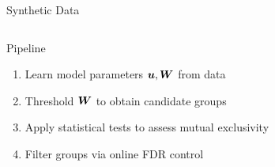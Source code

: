\documentclass[mathserif]{beamer}
\begin{document}
\begin{frame}{Synthetic Data}
\begin{columns}
\begin{column}{0.7\textwidth}
%
\end{column}
\end{columns}
\end{frame}

\begin{frame}{Pipeline}
	\begin{enumerate}
		\item Learn model parameters $\bm{u}, \bm{W}$ from data\\[1em]
		\item Threshold $\bm{W}$ to obtain candidate groups\\[1em]
		\item Apply statistical tests to assess mutual exclusivity\\[1em]
		\item Filter groups via online FDR control
	\end{enumerate}
\end{frame}
\end{document}
